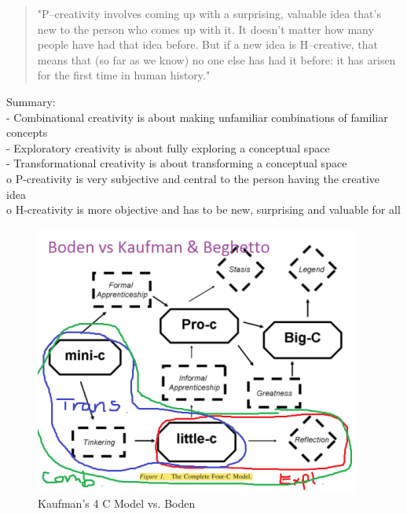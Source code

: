 \begin{quote}
	"P–creativity involves coming up with a surprising, valuable idea that’s new to the person who comes up with it. It doesn’t matter how many people have had that idea before. But if a new idea is H–creative, that means that (so far as we know) no one else has had it before: it has arisen for the first time in human history." \citep{Boden2003}
\end{quote}

\begin{shaded}
  Summary:\\
  -	Combinational creativity is about making unfamiliar combinations of familiar concepts\\
  -	Exploratory creativity is about fully exploring a conceptual space\\
  -	Transformational creativity is about transforming a conceptual space\\
  o	P-creativity is very subjective and central to the person having the creative idea\\
  o	H-creativity is more objective and has to be new, surprising and valuable for all
\end{shaded}

\begin{figure}[htb] %
  \centering
  \includegraphics[width=\linewidth]{images/4CBoden.png}
\caption[Kaufman vs Boden]{Kaufman's 4 C Model vs. Boden}
\label{fig:4CB}
\end{figure}

